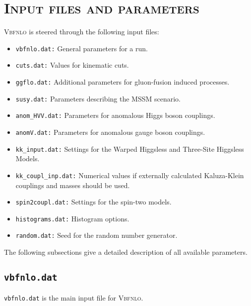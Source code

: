 \documentclass[english,12pt]{article}
\begin{document}
\newpage
\section{\textsc{Input files and parameters}}
\label{sec:input} 
\textsc{Vbfnlo} is steered through the following input files:
\begin{itemize}
\item {\tt vbfnlo.dat:} General parameters for a run.
\item {\tt cuts.dat:} Values for kinematic cuts.
\item {\tt ggflo.dat:} Additional parameters for gluon-fusion induced processes.
\item {\tt susy.dat:} Parameters describing the MSSM scenario.
\item {\tt anom\_HVV.dat:} Parameters for anomalous Higgs boson couplings.
\item {\tt anomV.dat:} Parameters for anomalous gauge boson couplings.
\item {\tt kk\_input.dat:} Settings for the Warped Higgsless and
Three-Site Higgsless Models.
\item {\tt kk\_coupl\_inp.dat:} Numerical values if externally
calculated Kaluza-Klein couplings and masses should be used.
\item {\tt spin2coupl.dat:} Settings for the spin-two models.
\item {\tt histograms.dat:} Histogram options.
\item {\tt random.dat:} Seed for the random number generator.
\end{itemize}

The following subsections give a detailed description of all available parameters.


\subsection{{\tt vbfnlo.dat}}
\label{sec:vbfnlodat} 

{\tt vbfnlo.dat} is the main input file for \textsc{Vbfnlo}.
\end{document}
